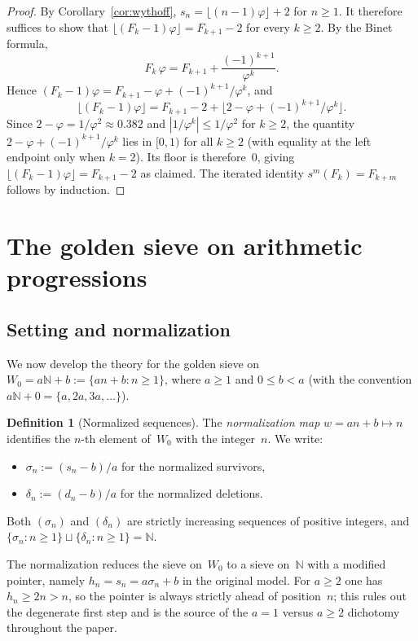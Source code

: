 \documentclass[11pt]{article}
\numberwithin{equation}{section}
\theoremstyle{plain}
\theoremstyle{definition}
\newtheorem{definition}[theorem]{Definition}
\theoremstyle{remark}
\newcommand{\N}{\mathbb{N}}
\begin{document}
\begin{proof}
By Corollary~\ref{cor:wythoff}, $s_n = \lfloor(n-1)\varphi\rfloor+2$
for $n\ge1$.  It therefore suffices to show that
$\lfloor(F_k-1)\varphi\rfloor = F_{k+1}-2$ for every $k\ge2$.
By the Binet formula,
\[
  F_k\,\varphi = F_{k+1} + \frac{(-1)^{k+1}}{\varphi^k}.
\]
Hence $(F_k-1)\varphi = F_{k+1}-\varphi + (-1)^{k+1}/\varphi^k$, and
\[
  \lfloor(F_k-1)\varphi\rfloor
  = F_{k+1} - 2 + \bigl\lfloor 2-\varphi+(-1)^{k+1}/\varphi^k\bigr\rfloor.
\]
Since $2-\varphi = 1/\varphi^2 \approx 0.382$
and $|1/\varphi^k|\le 1/\varphi^2$ for $k\ge2$, the
quantity $2-\varphi+(-1)^{k+1}/\varphi^k$ lies in $[0,1)$ for all
$k\ge2$ (with equality at the left endpoint only when $k=2$).
Its floor is therefore~$0$, giving
$\lfloor(F_k-1)\varphi\rfloor = F_{k+1}-2$ as claimed.
The iterated identity $s^m(F_k)=F_{k+m}$ follows by induction.
\end{proof}


\section{The golden sieve on arithmetic progressions}\label{sec:general}

\subsection{Setting and normalization}

We now develop the theory for the golden sieve on
$W_0 = a\N+b := \{an+b : n \ge 1\}$, where $a \ge 1$ and $0\le b < a$
(with the convention $a\N+0 = \{a, 2a, 3a, \ldots\}$).

\begin{definition}[Normalized sequences]\label{def:normalized}
The \emph{normalization map} $w = an+b \mapsto n$ identifies the
$n$-th element of~$W_0$ with the integer~$n$.  We write:
\begin{itemize}
\item $\sigma_n := (s_n - b)/a$ for the normalized survivors,
\item $\delta_n := (d_n - b)/a$ for the normalized deletions.
\end{itemize}
Both $(\sigma_n)$ and $(\delta_n)$ are strictly increasing sequences
of positive integers, and
$\{\sigma_n : n \ge 1\} \sqcup \{\delta_n : n \ge 1\} = \N$.
\end{definition}

The normalization reduces the sieve on~$W_0$ to a sieve on~$\N$ with
a modified pointer, namely $h_n = s_n = a\sigma_n + b$ in the original model.
For $a\ge2$ one has $h_n\ge 2n>n$, so the pointer is always strictly ahead
of position~$n$; this rules out the degenerate first step and is the source
of the $a=1$ versus $a\ge2$ dichotomy throughout the paper.
\end{document}
